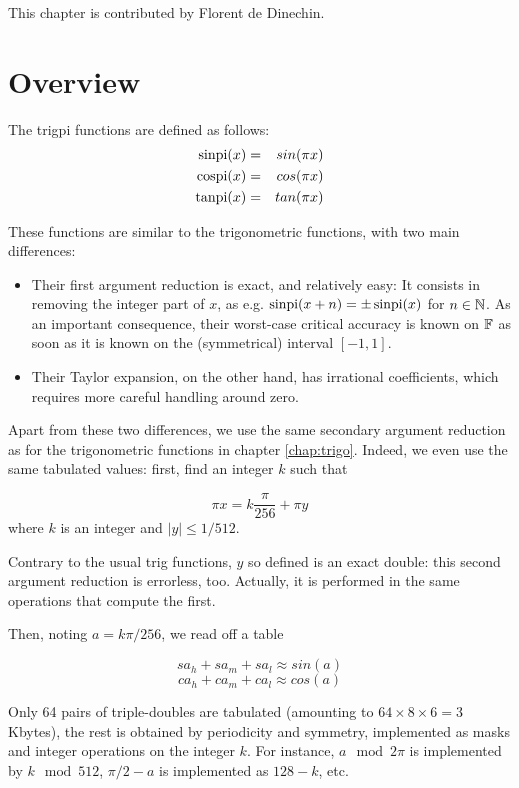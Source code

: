 This chapter is contributed by Florent de Dinechin.


\section{Overview}
The trigpi functions are defined as follows:
\begin{eqnarray}
 \operatorname{sinpi}(x) &=& sin(\pi x) \\
 \operatorname{cospi}(x) &=& cos(\pi x) \\
 \operatorname{tanpi}(x) &=& tan(\pi x)  
\end{eqnarray}

These functions are similar to the trigonometric functions, with
two main differences:
\begin{itemize}
\item Their first argument reduction is exact, and relatively easy: It
  consists in removing the integer part of $x$, as e.g.
  $\operatorname{sinpi}(x+n)=\pm \operatorname{sinpi}(x)$ for $n\in\mathbb {N}$. As an important consequence, their
  worst-case critical accuracy is known on $\mathbb {F}$ as soon as it is known
  on  the (symmetrical) interval $[-1, 1]$.
\item Their Taylor expansion, on the other hand, has irrational
  coefficients, which requires more careful handling around zero.
\end{itemize}

Apart from these two differences, we use the same secondary argument
reduction as for the trigonometric functions in chapter
\ref{chap:trigo}. Indeed, we even use the same tabulated values: first, find an integer $k$ such that

\begin{equation}
  \pi x = k\frac{\pi}{256} + \pi y\label{eq:trigoargred}
\end{equation}
where $k$ is an integer and  $ |y| \leq {1}/{512}$.

Contrary to the usual trig functions, $y$ so defined is an exact
double: this second argument reduction is errorless, too. Actually, it
is performed in the same operations that compute the first.

Then, noting $a=k\pi/256$, 
we read off a table 

$$sa_h+sa_m+sa_l \approx sin(a)$$
$$ca_h+ca_m+ca_l \approx cos(a)$$

Only 64 pairs of triple-doubles  are tabulated (amounting to
$64\times 8 \times 6 = 3$ Kbytes), the rest is obtained by
periodicity and symmetry, implemented as masks and integer operations
on the integer $k$. For instance,  $a \mod 2\pi$ is implemented by $k \mod 512$,
$\pi/2-a$ is implemented as $128-k$, etc.


